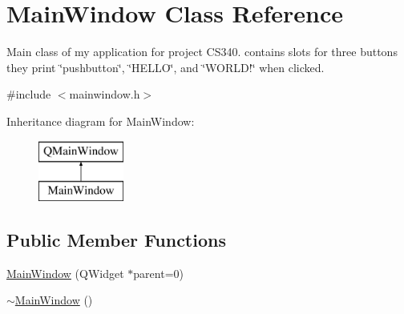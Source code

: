 \hypertarget{class_main_window}{\section{Main\-Window Class Reference}
\label{class_main_window}
}


Main class of my application for project C\-S340. contains slots for three buttons they print \char`\"{}pushbutton\char`\"{}, \char`\"{}\-H\-E\-L\-L\-O\char`\"{}, and \char`\"{}\-W\-O\-R\-L\-D!\char`\"{} when clicked.  




{\ttfamily \#include $<$mainwindow.\-h$>$}

Inheritance diagram for Main\-Window\-:\begin{figure}[H]
\begin{center}
\leavevmode
\includegraphics[height=2.000000cm]{class_main_window}
\end{center}
\end{figure}
\subsection*{Public Member Functions}
\begin{DoxyCompactItemize}
\item 
\hyperlink{class_main_window_a8b244be8b7b7db1b08de2a2acb9409db}{Main\-Window} (Q\-Widget $\ast$parent=0)
\item 
\hyperlink{class_main_window_ae98d00a93bc118200eeef9f9bba1dba7}{$\sim$\-Main\-Window} ()
\end{DoxyCompactItemize}
